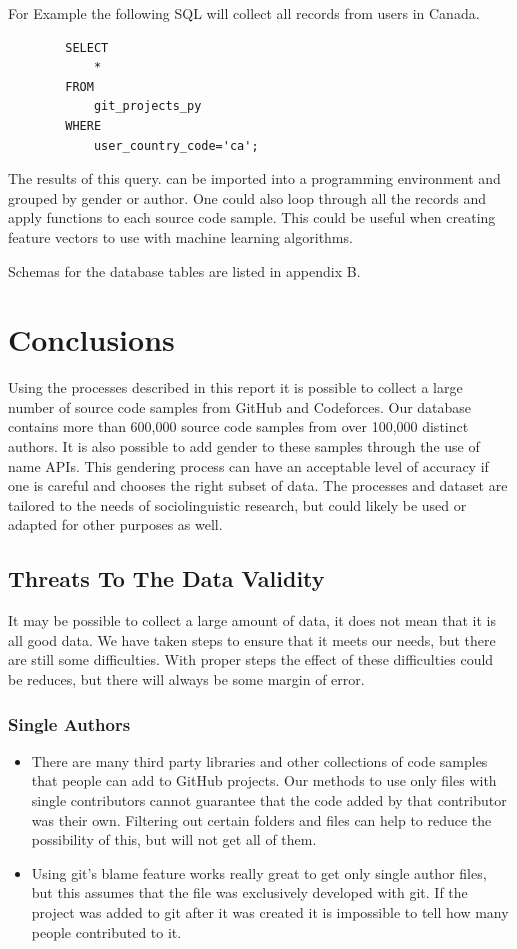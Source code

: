 \documentclass[12pt]{article}
\begin{document}
For Example the following SQL will collect all records from users in Canada.

\begin{singlespacing}
    \begin{verbatim}
        SELECT
            *
        FROM
            git_projects_py
        WHERE
            user_country_code='ca';
    \end{verbatim}
\end{singlespacing}
The results of this query. can be imported into a programming environment and grouped by gender or author. One could also loop through all the records and apply functions to each source code sample. This could be useful when creating feature vectors to use with machine learning algorithms.

Schemas for the database tables are listed in appendix B.


\section{Conclusions}
Using the processes described in this report it is possible to collect a large number of source code samples from GitHub and Codeforces. Our database contains more than 600,000 source code samples from over 100,000 distinct authors. It is also possible to add gender to these samples through the use of name APIs. This gendering process can have an acceptable level of accuracy if one is careful and chooses the right subset of data. The processes and dataset are tailored to the needs of sociolinguistic research, but could likely be used or adapted for other purposes as well.

\subsection{Threats To The Data Validity}
It may be possible to collect a large amount of data, it does not mean that it is all good data. We have taken steps to ensure that it meets our needs, but there are still some difficulties. With proper steps the effect of these difficulties could be reduces, but there will always be some margin of error.

\subsubsection*{Single Authors}
\begin{itemize}
    \item There are many third party libraries and other collections of code samples that people can add to GitHub projects. Our methods to use only files with single contributors cannot guarantee that the code added by that contributor was their own. Filtering out certain folders and files can help to reduce the possibility of this, but will not get all of them.
    \item Using git's blame feature works really great to get only single author files, but this assumes that the file was exclusively developed with git. If the project was added to git after it was created it is impossible to tell how many people contributed to it.
\end{itemize}
\end{document}
